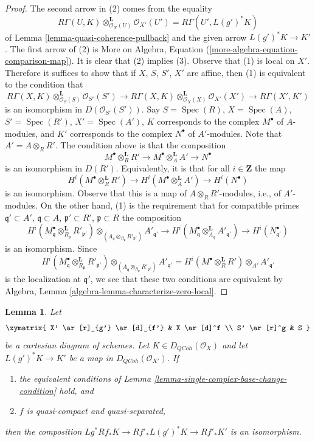 \documentclass{stacks-project}
\theoremstyle{plain}
\newtheorem{lemma}[subsection]{Lemma}
\theoremstyle{definition}
\theoremstyle{remark}
\numberwithin{equation}{subsection}
\def\Spec{\mathop{\mathrm{Spec}}}
\def\QCoh{\mathit{QCoh}}
\begin{document}
\begin{proof}
The second arrow in (2) comes from the equality
$$
R\Gamma(U, K) \otimes_{\mathcal{O}_X(U)}^\mathbf{L} \mathcal{O}_{X'}(U') =
R\Gamma(U', L(g')^*K)
$$
of Lemma \ref{lemma-quasi-coherence-pullback} and the given arrow
$L(g')^*K \to K'$. The first arrow of (2) is
More on Algebra, Equation (\ref{more-algebra-equation-comparison-map}).
It is clear that (2) implies (3). Observe that (1) is local on $X'$.
Therefore it suffices to show that if $X$, $S$, $S'$, $X'$ are affine, then
(1) is equivalent to the condition that
$$
R\Gamma(X, K) \otimes_{\mathcal{O}_S(S)}^\mathbf{L} \mathcal{O}_{S'}(S')
\to
R\Gamma(X, K) \otimes_{\mathcal{O}_X(X)}^\mathbf{L} \mathcal{O}_{X'}(X')
\to
R\Gamma(X', K')
$$
is an isomorphism in $D(\mathcal{O}_{S'}(S'))$. Say
$S = \Spec(R)$, $X = \Spec(A)$, $S' = \Spec(R')$, $X' = \Spec(A')$,
$K$ corresponds to the complex $M^\bullet$ of $A$-modules, and
$K'$ corresponds to the complex $N^\bullet$ of $A'$-modules.
Note that $A' = A \otimes_R R'$. The condition above is that the composition
$$
M^\bullet \otimes_R^\mathbf{L} R' \to
M^\bullet \otimes_A^\mathbf{L} A' \to
N^\bullet
$$
is an isomorphism in $D(R')$. Equivalently, it is that for all
$i \in \mathbf{Z}$ the map
$$
H^i(M^\bullet \otimes_R^\mathbf{L} R') \to
H^i(M^\bullet \otimes_A^\mathbf{L} A') \to
H^i(N^\bullet)
$$
is an isomorphism. Observe that this is a map of $A \otimes_R R'$-modules,
i.e., of $A'$-modules. On the other hand, (1) is the requirement
that for compatible primes
$\mathfrak q' \subset A'$, $\mathfrak q \subset A$,
$\mathfrak p' \subset R'$, $\mathfrak p \subset R$
the composition
$$
H^i(M^\bullet_\mathfrak q \otimes_{R_\mathfrak p}^\mathbf{L} R'_{\mathfrak p'})
\otimes_{(A_\mathfrak q \otimes_{R_\mathfrak p} R'_{\mathfrak p'})}
A'_{\mathfrak q'} \to
H^i(M^\bullet_{\mathfrak q}
\otimes_{A_\mathfrak q}^\mathbf{L} A'_{\mathfrak q'})
\to H^i(N^\bullet_{\mathfrak q'})
$$
is an isomorphism. Since
$$
H^i(M^\bullet_\mathfrak q \otimes_{R_\mathfrak p}^\mathbf{L} R'_{\mathfrak p'})
\otimes_{(A_\mathfrak q \otimes_{R_\mathfrak p} R'_{\mathfrak p'})}
A'_{\mathfrak q'} =
H^i(M^\bullet \otimes_R^\mathbf{L} R') \otimes_{A'} A'_{\mathfrak q'}
$$
is the localization at $\mathfrak q'$,
we see that these two conditions are equivalent by
Algebra, Lemma \ref{algebra-lemma-characterize-zero-local}.
\end{proof}

\begin{lemma}
\label{lemma-single-complex-base-change}
Let
$$
\xymatrix{
X' \ar[r]_{g'} \ar[d]_{f'} &
X \ar[d]^f \\
S' \ar[r]^g &
S
}
$$
be a cartesian diagram of schemes. Let $K \in D_\QCoh(\mathcal{O}_X)$
and let $L(g')^*K \to K'$ be a map in $D_\QCoh(\mathcal{O}_{X'})$.
If
\begin{enumerate}
\item the equivalent conditions of
Lemma \ref{lemma-single-complex-base-change-condition} hold, and
\item $f$ is quasi-compact and quasi-separated,
\end{enumerate}
then the composition $Lg^*Rf_*K \to Rf'_*L(g')^*K \to Rf'_*K'$
is an isomorphism.
\end{lemma}
\end{document}
